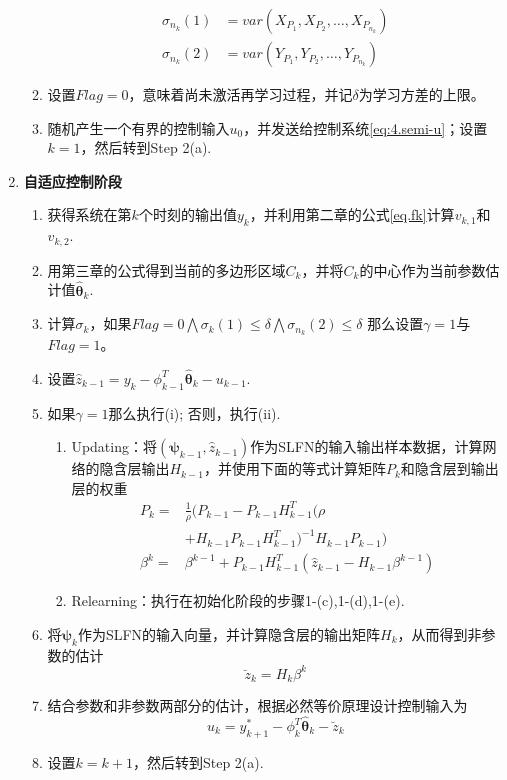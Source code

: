 \begin{enumerate}
\begin{enumerate}
\begin{equation}
\begin{split}
\sigma_{n_{k}}(1) &= var(X_{P_{1}},X_{P_{2}},\ldots,X_{P_{n_{k}}}) \\
\sigma_{n_{k}}(2) &= var(Y_{P_{1}},Y_{P_{2}},\ldots,Y_{P_{n_{k}}})
\end{split}
\end{equation}
\item 设置$Flag=0$，意味着尚未激活再学习过程，并记$\delta$为学习方差的上限。
\item 随机产生一个有界的控制输入$u_{0}$，并发送给控制系统\eqref{eq:4.semi-u}；设置$k=1$，然后转到Step 2(a).
\end{enumerate}
\item \textbf{自适应控制阶段}
\begin{enumerate}%
\item 获得系统在第$k$个时刻的输出值$y_{k}$，并利用第二章的公式\eqref{eq.fk}计算$v_{k,1}$和$v_{k,2}$.
\item 用第三章的公式得到当前的多边形区域$C_{k}$，并将$C_{k}$的中心作为当前参数估计值$\hat{\bm{\theta}}_{k}$.
\item 计算$\sigma_{k}$，如果$Flag=0\bigwedge\sigma_{k}(1)\leq\delta\bigwedge\sigma_{n_{k}}(2)\leq\delta$ 那么设置$\gamma=1$与$Flag=1$。
\item 设置$\hat{z}_{k-1}=y_{k}-\phi_{k-1}^{T}\hat{\bm{\theta}}_{k}-u_{k-1}$.
\item 如果$\gamma=1$那么执行(i); 否则，执行(ii).
\begin{enumerate}%
\item Updating：将$(\bm{\psi}_{k-1},\hat{z}_{k-1})$作为SLFN的输入输出样本数据，计算网络的隐含层输出$H_{k-1}$，并使用下面的等式计算矩阵$P_{k}$和隐含层到输出层的权重
\begin{equation}\label{eq.elmk}
\begin{split}%
P_{k}=&\frac{1}{\rho}(P_{k-1}-P_{k-1}H_{k-1}^{T}(\rho\\
&+H_{k-1}P_{k-1}H_{k-1}^{T})^{-1}H_{k-1}P_{k-1}) \\
\beta^{k}=&\beta^{k-1} + P_{k-1}H_{k-1}^{T}(\hat{z}_{k-1}-H_{k-1}\beta^{k-1})
\end{split}
\end{equation}
\item Relearning：执行在初始化阶段的步骤1-(c),1-(d),1-(e).
\end{enumerate}
\item 将$\bm{\psi}_{k}$作为SLFN的输入向量，并计算隐含层的输出矩阵$H_{k}$，从而得到非参数的估计
\begin{equation}\label{eq.hat.z.k}
\breve{z}_{k}=H_{k}\beta^{k}
\end{equation}
\item 结合参数和非参数两部分的估计，根据必然等价原理设计控制输入为
\begin{equation}\label{eq.4:u}
u_{k}=y^{*}_{k+1}-\phi_{k}^{T}\hat{\bm{\theta}}_{k}-\breve{z}_{k}
\end{equation}
\item 设置$k=k+1$，然后转到Step 2(a).
\end{enumerate}
\end{enumerate}

